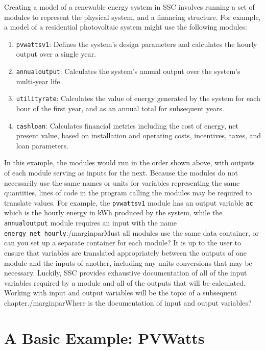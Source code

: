 \documentclass{article}
\begin{document}
Creating a model of a renewable energy system in SSC involves running a set of modules to represent the physical system, and a financing structure. For example, a model of a residential photovoltaic system might use the following modules:

\begin{enumerate}
\item \texttt{pvwattsv1}: Defines the system's design parameters and calculates the hourly output over a single year.
\item \texttt{annualoutput}: Calculates the system's annual output over the system's multi-year life.
\item \texttt{utilityrate}: Calculates the value of energy generated by the system for each hour of the first year, and as an annual total for subsequent years.
\item \texttt{cashloan}: Calculates financial metrics including the cost of energy, net present value, based on installation and operating costs, incentives, taxes, and loan parameters.
\end{enumerate}

In this example, the modules would run in the order shown above, with outputs of each module serving as inputs for the next. Because the modules do not necessarily use the same names or units for variables representing the same quantities, lines of code in the program calling the modules may be required to translate values.  For example, the \texttt{pvwattsv1} module has an output variable \texttt{ac} which is the hourly energy in kWh produced by the system, while the \texttt{annualoutput} module requires an input with the name \texttt{energy\_net\_hourly}./marginpar{Must all modules use the same data container, or can you set up a separate container for each module?}  It is up to the user to ensure that variables are translated appropriately between the outputs of one module and the inputs of another, including any units conversions that may be necessary.  Luckily, SSC provides exhaustive documentation of all of the input variables required by a module and all of the outputs that will be calculated.  Working with input and output variables will be the topic of a subsequent chapter./marginpar{Where is the documentation of input and output variables?}

\section{A Basic Example: PVWatts}
\end{document}
